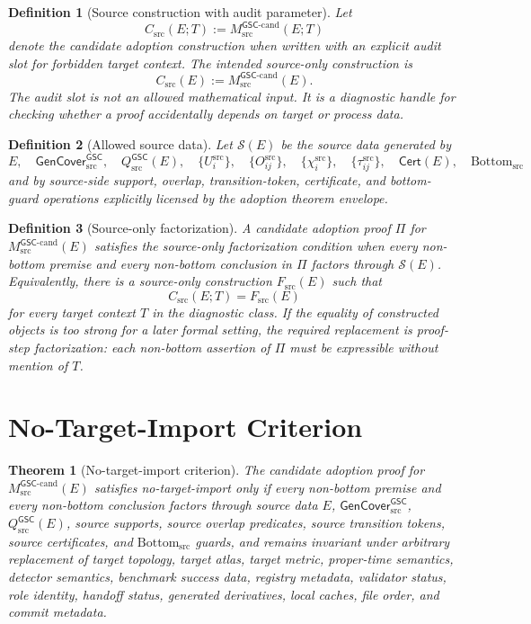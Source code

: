 \documentclass[11pt]{article}
\newcommand{\GSC}{\mathsf{GSC}}
\newcommand{\Mgsccand}{M_{\mathrm{src}}^{\GSC\mbox{-}\mathrm{cand}}}
\newcommand{\GenCover}{\mathsf{GenCover}_{\mathrm{src}}^{\GSC}}
\newcommand{\Qsrc}{Q_{\mathrm{src}}^{\GSC}}
\newcommand{\Cert}{\mathsf{Cert}}
\newcommand{\Bottomsrc}{\mathrm{Bottom}_{\mathrm{src}}}
\newcommand{\Csrc}{C_{\mathrm{src}}}
\newcommand{\Fsrc}{F_{\mathrm{src}}}
\newcommand{\Tctx}{T}
\newtheorem{definition}{Definition}
\newtheorem{theorem}{Theorem}
\begin{document}
\begin{definition}[Source construction with audit parameter]
Let
\[
  \Csrc(E;\Tctx) := \Mgsccand(E;\Tctx)
\]
denote the candidate adoption construction when written with an explicit audit
slot for forbidden target context. The intended source-only construction is
\[
  \Csrc(E) := \Mgsccand(E).
\]
The audit slot is not an allowed mathematical input. It is a diagnostic handle
for checking whether a proof accidentally depends on target or process data.
\end{definition}

\begin{definition}[Allowed source data]
Let \(\mathcal{S}(E)\) be the source data generated by
\[
  E,\quad \GenCover,\quad \Qsrc(E),\quad
  \{U_i^{\mathrm{src}}\},\quad \{O_{ij}^{\mathrm{src}}\},\quad
  \{\chi_i^{\mathrm{src}}\},\quad \{\tau_{ij}^{\mathrm{src}}\},\quad
  \Cert(E),\quad \Bottomsrc
\]
and by source-side support, overlap, transition-token, certificate, and
bottom-guard operations explicitly licensed by the adoption theorem envelope.
\end{definition}

\begin{definition}[Source-only factorization]
A candidate adoption proof \(\Pi\) for \(\Mgsccand(E)\) satisfies the
source-only factorization condition when every non-bottom premise and every
non-bottom conclusion in \(\Pi\) factors through \(\mathcal{S}(E)\). Equivalently,
there is a source-only construction \(\Fsrc(E)\) such that
\[
  \Csrc(E;\Tctx)=\Fsrc(E)
\]
for every target context \(\Tctx\) in the diagnostic class. If the equality of
constructed objects is too strong for a later formal setting, the required
replacement is proof-step factorization: each non-bottom assertion of \(\Pi\)
must be expressible without mention of \(\Tctx\).
\end{definition}

\section{No-Target-Import Criterion}

\begin{theorem}[No-target-import criterion]
The candidate adoption proof for \(\Mgsccand(E)\) satisfies no-target-import
only if every non-bottom premise and every non-bottom conclusion factors
through source data \(E\), \(\GenCover\), \(\Qsrc(E)\), source supports, source
overlap predicates, source transition tokens, source certificates, and
\(\Bottomsrc\) guards, and remains invariant under arbitrary replacement of
target topology, target atlas, target metric, proper-time semantics, detector
semantics, benchmark success data, registry metadata, validator status, role
identity, handoff status, generated derivatives, local caches, file order, and
commit metadata.
\end{theorem}
\end{document}
